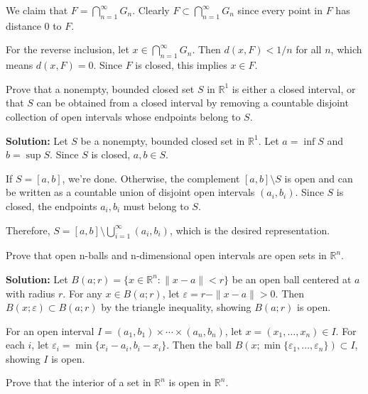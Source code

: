 We claim that $F = \bigcap_{n=1}^{\infty} G_n$. Clearly $F \subset \bigcap_{n=1}^{\infty} G_n$ since every point in $F$ has distance 0 to $F$.

For the reverse inclusion, let $x \in \bigcap_{n=1}^{\infty} G_n$. Then $d(x,F) < 1/n$ for all $n$, which means $d(x,F) = 0$. Since $F$ is closed, this implies $x \in F$.

\begin{problembox}
Prove that a nonempty, bounded closed set $S$ in $\mathbb{R}^1$ is either a closed interval, or that $S$ can be obtained from a closed interval by removing a countable disjoint collection of open intervals whose endpoints belong to $S$.
\end{problembox}

\textbf{Solution:} Let $S$ be a nonempty, bounded closed set in $\mathbb{R}^1$. Let $a = \inf S$ and $b = \sup S$. Since $S$ is closed, $a, b \in S$.

If $S = [a,b]$, we're done. Otherwise, the complement $[a,b] \setminus S$ is open and can be written as a countable union of disjoint open intervals $(a_i, b_i)$. Since $S$ is closed, the endpoints $a_i, b_i$ must belong to $S$.

Therefore, $S = [a,b] \setminus \bigcup_{i=1}^{\infty} (a_i, b_i)$, which is the desired representation.

\begin{problembox}
Prove that open n-balls and n-dimensional open intervals are open sets in $\mathbb{R}^n$.
\end{problembox}

\textbf{Solution:} Let $B(a;r) = \{x \in \mathbb{R}^n : \|x-a\| < r\}$ be an open ball centered at $a$ with radius $r$. For any $x \in B(a;r)$, let $\varepsilon = r - \|x-a\| > 0$. Then $B(x;\varepsilon) \subset B(a;r)$ by the triangle inequality, showing $B(a;r)$ is open.

For an open interval $I = (a_1,b_1) \times \cdots \times (a_n,b_n)$, let $x = (x_1,\ldots,x_n) \in I$. For each $i$, let $\varepsilon_i = \min\{x_i - a_i, b_i - x_i\}$. Then the ball $B(x;\min\{\varepsilon_1,\ldots,\varepsilon_n\}) \subset I$, showing $I$ is open.

\begin{problembox}
Prove that the interior of a set in $\mathbb{R}^n$ is open in $\mathbb{R}^n$.
\end{problembox}

